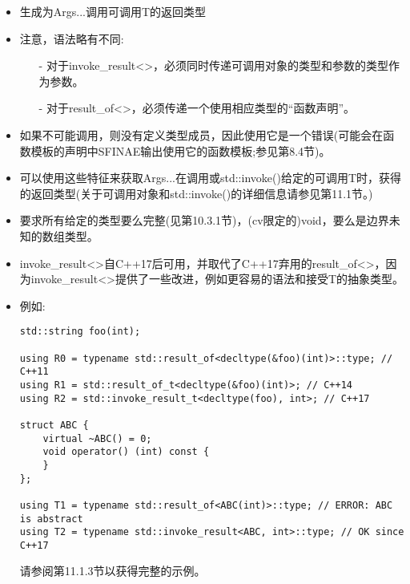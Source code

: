 \begin{itemize}
\item 
生成为Args...调用可调用T的返回类型

\item 
注意，语法略有不同:

\begin{itemize}
\item [-]
对于invoke\_result<>，必须同时传递可调用对象的类型和参数的类型作为参数。

\item [-]
对于result\_of<>，必须传递一个使用相应类型的“函数声明”。
\end{itemize}

\item 
如果不可能调用，则没有定义类型成员，因此使用它是一个错误(可能会在函数模板的声明中SFINAE输出使用它的函数模板;参见第8.4节)。

\item 
可以使用这些特征来获取Args...在调用或std::invoke()给定的可调用T时，获得的返回类型(关于可调用对象和std::invoke()的详细信息请参见第11.1节。)

\item 
要求所有给定的类型要么完整(见第10.3.1节)，(cv限定的)void，要么是边界未知的数组类型。

\item 
invoke\_result<>自C++17后可用，并取代了C++17弃用的result\_of<>，因为invoke\_result<>提供了一些改进，例如更容易的语法和接受T的抽象类型。

\item 
例如:
\begin{lstlisting}[style=styleCXX]
std::string foo(int);

using R0 = typename std::result_of<decltype(&foo)(int)>::type; // C++11
using R1 = std::result_of_t<decltype(&foo)(int)>; // C++14
using R2 = std::invoke_result_t<decltype(foo), int>; // C++17

struct ABC {
	virtual ~ABC() = 0;
	void operator() (int) const {
	}
};

using T1 = typename std::result_of<ABC(int)>::type; // ERROR: ABC is abstract
using T2 = typename std::invoke_result<ABC, int>::type; // OK since C++17
\end{lstlisting}

请参阅第11.1.3节以获得完整的示例。

\end{itemize}

\newpage


